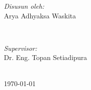 \begin{titlepage}
 

\begin{minipage}{0.4\textwidth}
\begin{flushleft} \large
\emph{Disusun oleh:}\\
Arya Adhyaksa Waskita
\end{flushleft}
\end{minipage}
~
\begin{minipage}{0.4\textwidth}
\begin{flushright} \large
\emph{Supervisor:} \\
Dr. Eng. Topan Setiadipura
\end{flushright}
\end{minipage}\\[4cm]



{\large \today}\\[3cm] %
 

\vfill %

\end{titlepage}

